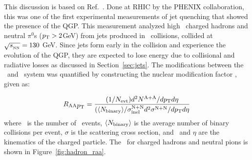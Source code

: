 

This discussion is based on Ref.~\cite{PhysRevLett.88.022301}.
Done at RHIC by the PHENIX collaboration, this was one of the first experimental measurements of jet quenching that showed the presence of the QGP.
This measurement analyzed high \pt\ charged hadrons and neutral $\pi^0$s ($\mbox{$p_{\mathrm{T}}$} > 2$GeV) from jets produced in \AuAu\ collisions, collided at $\mbox{$\sqrt{s_{_\text{NN}}}$} = 130$ GeV.
Since jets form early in the collision and experience the evolution of the QGP, they are expected to lose energy due to collisional and radiative losses as discussed in Section~\ref{sec:jets}.
The modifications between the \pp\ and \AuAu\ system was quantified by constructing the nuclear modification factor \RAA, given as:

\begin{align}
\mbox{$R_{\rm AA}$}_{\mbox{$p_{\mathrm{T}}$}} = \frac{(1 / \mbox{$N_{\mathrm{evt}}$}) d^2 N^{\rm A+A} / d\mbox{$p_{\mathrm{T}}$} d\eta}{(\langle N_{\rm binary} \rangle / \sigma_{\rm inel}^{\rm N+N} d^2 \sigma^{\rm N+N} / d\mbox{$p_{\mathrm{T}}$} d\eta}
\end{align}
where \Nevt\ is the number of \AuAu\ events, $\langle N_{\rm binary} \rangle$ is the average number of binary collisions per event, $\sigma$ is the scattering cross section, and \pt\ and $\eta$ are the kinematics of the charged particle.
The \RAA\ for charged hadrons and neutral pions is shown in Figure~\ref{fig:hadron_raa}.

